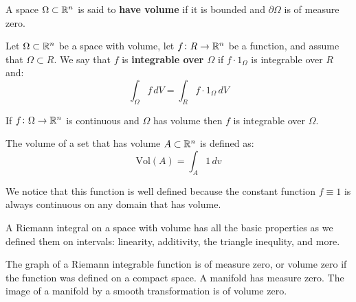 \documentclass[11pt,a4paper]{article}
\begin{document}
	\begin{definition}
		A space $\Omega \subset \mathbb{R}^n$ is said to \textbf{have volume}
		if it is bounded and $\partial \Omega$ is of measure zero.
	\end{definition}
	\begin{definition}
		Let $\Omega \subset \mathbb{R}^n$ be a space with volume, let
		$f \colon R \to \mathbb{R}^n$ be a function, and assume that
		$\Omega \subset R$. We say that $f$ is 
		\textbf{integrable over $\Omega$} if $f\cdot1_\Omega$
		is integrable over $R$ and:
		\[
			\int_{\Omega}{f\,dV} = \int_{R}{f\cdot1_\Omega\,dV}
		\]
	\end{definition}
	\begin{theorem}
		If $f \colon \Omega \to \mathbb{R}^n$ is continuous and $\Omega$
		has volume then $f$ is integrable over $\Omega$.
	\end{theorem}
	\begin{definition}
		The volume of a set that has volume $A \subset \mathbb{R}^n$ is 
		defined as:
		\[
			\mathrm{Vol}(A) = \int_{A}{1\,dv}
		\]
	\end{definition}
	We notice that this function is well defined because the constant
	function $f \equiv 1$ is always continuous on any domain that
	has volume.
	\begin{remark}
		A Riemann integral on a space with volume has all the basic
		properties as we defined them on intervals: linearity,
		additivity, the triangle inequlity, and more. 
	\end{remark}
	\begin{theorem}
		The graph of a Riemann integrable function is of measure 
		zero, or volume zero if the function was defined on a
		compact space. A manifold has measure zero. The image
		of a manifold by a smooth transformation is of volume zero. 
	\end{theorem}
	
	
	
	
	
	
	
	
	
	
\end{document}
